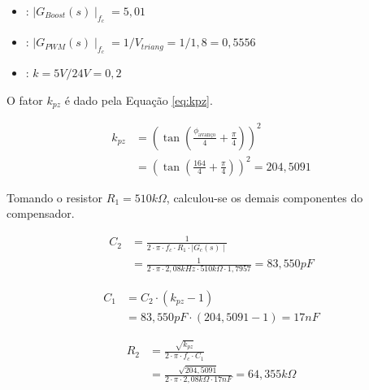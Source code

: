 \documentclass[a4paper]{article}
\begin{document}
{\begin{itemize}

\item {}: $ \mid G_{Boost} \left( s \right) \mid_{f_c} = 5,01$

\item {}: $\mid G_{PWM}\left( s \right) \mid_{f_c} = 1/V_{triang} = 1/1,8 = 0,5556$

\item {}: $ k = 5V / 24V = 0,2 $

\end{itemize}

O fator $k_{pz}$ é dado pela Equação \ref{eq:kpz}.

\begin{equation}
\label{eq:kpz}
\begin{split}
k_{pz} & = \left( \tan \left( \frac{\phi_{\text{avanço}}}{4}+\frac{\pi}{4} \right)  \right)^2 \\
& = \left( \tan \left( \frac{164}{4}+\frac{\pi}{4} \right)  \right)^2 = 204,5091
\end{split}
\end{equation}

Tomando o resistor $R_1 = 510k\Omega$, calculou-se os demais componentes do compensador.

\begin{equation}
\label{eq:comp-c2}
\begin{split}
C_{2} & = \frac{1}{2 \cdot \pi \cdot f_{c} \cdot R_{1} \cdot \mid G_{c} \left( s \right)\mid} \\
& = \frac{1}{2 \cdot \pi \cdot 2,08kHz \cdot 510k\Omega \cdot 1,7957} = 83,550pF
\end{split}
\end{equation}

\begin{equation}
\label{eq:comp-c1}
\begin{split}
C_{1} & = C_{2} \cdot \left( k_{pz}-1 \right) \\
& =  83,550pF \cdot \left( 204,5091 - 1 \right) = 17nF
\end{split}
\end{equation}

\begin{equation}
\label{eq:comp-r2}
\begin{split}
R_{2} & = \frac{\sqrt{k_{pz}}}{2 \cdot \pi \cdot f_{c} \cdot C_{1}} \\
& = \frac{\sqrt{204,5091}}{2 \cdot \pi \cdot 2,08k\Omega \cdot 17nF} = 64,355k\Omega
\end{split}
\end{equation}

}
\end{document}

